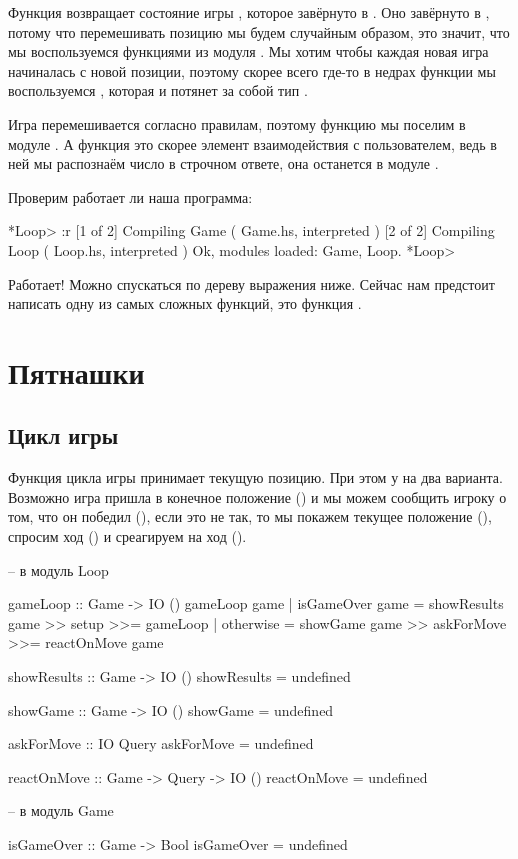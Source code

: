 Функция  возвращает состояние игры ,
которое завёрнуто в . Оно завёрнуто в , потому
что перемешивать позицию мы будем случайным образом, это
значит, что мы воспользуемся функциями из модуля .
Мы хотим чтобы каждая новая игра начиналась с новой позиции,
поэтому скорее всего где-то в недрах функции 
мы воспользуемся , которая и потянет за собой
тип . 

Игра перемешивается согласно правилам, поэтому функцию
 мы поселим в модуле . А функция 
 это скорее элемент взаимодействия с пользователем,
ведь в ней мы распознаём число в строчном ответе, 
она останется в модуле .

Проверим работает ли наша программа:


\begin{code}
*Loop> :r
[1 of 2] Compiling Game             ( Game.hs, interpreted )
[2 of 2] Compiling Loop             ( Loop.hs, interpreted )
Ok, modules loaded: Game, Loop.
*Loop> 
\end{code}

Работает! Можно спускаться по дереву выражения ниже. 
Сейчас нам предстоит написать одну из самых сложных 
функций, это функция .

\section{Пятнашки}

\subsection{Цикл игры}

Функция цикла игры принимает текущую позицию. При этом
у на два варианта. Возможно игра пришла в конечное положение
() и мы можем сообщить игроку о том, что 
он победил (), если это не так, то мы 
покажем текущее положение (),
спросим ход () и среагируем на ход 
().

\begin{code}
-- в модуль Loop

gameLoop :: Game -> IO ()
gameLoop game 
    | isGameOver game   = showResults game >> setup >>= gameLoop
    | otherwise         = showGame game >> askForMove >>= reactOnMove game


showResults :: Game -> IO ()
showResults = undefined

showGame :: Game -> IO ()
showGame = undefined

askForMove :: IO Query
askForMove = undefined

reactOnMove :: Game -> Query -> IO ()
reactOnMove = undefined

-- в модуль Game

isGameOver :: Game -> Bool
isGameOver = undefined
\end{code}

